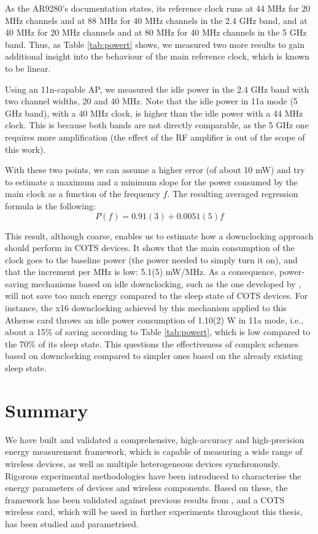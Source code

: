 \documentclass[twoside,nohyper]{tufte-book}
\theoremstyle{definition}
\theoremstyle{definition}
\theoremstyle{definition}
\theoremstyle{remark}
\begin{document}
As the AR9280's documentation states, its reference clock runs at 44 MHz
for 20 MHz channels and at 88 MHz for 40 MHz channels in the 2.4 GHz
band, and at 40 MHz for 20 MHz channels and at 80 MHz for 40 MHz
channels in the 5 GHz band. Thus, as Table \ref{tab:powert} shows, we
measured two more results to gain additional insight into the behaviour
of the main reference clock, which is known to be
linear\cite[0pt]{Zhang2012}.

Using an 11n-capable AP, we measured the idle power in the 2.4 GHz band
with two channel widths, 20 and 40 MHz. Note that the idle power in 11a
mode (5 GHz band), with a 40 MHz clock, is higher than the idle power
with a 44 MHz clock. This is because both bands are not directly
comparable, as the 5 GHz one requires more amplification (the effect of
the RF amplifier is out of the scope of this work).

With these two points, we can assume a higher error (of about 10 mW) and
try to estimate a maximum and a minimum slope for the power consumed by
the main clock as a function of the frequency \(f\). The resulting
averaged regression formula is the following:
%
\begin{equation}
 P(f) = 0.91(3) + 0.0051(5)f \label{eq:Pf}
\end{equation}
%

This result, although coarse, enables us to estimate how a downclocking
approach should perform in COTS devices. It shows that the main
consumption of the clock goes to the baseline power (the power needed to
simply turn it on), and that the increment per MHz is low: 5.1(5)
mW/MHz. As a consequence, power-saving mechanisms based on idle
downclocking, such as the one developed by \citet{Zhang2012}, will not
save too much energy compared to the sleep state of COTS devices. For
instance, the x16 downclocking achieved by this mechanism applied to
this Atheros card throws an idle power consumption of 1.10(2) W in 11a
mode, i.e., about a 15\% of saving according to Table \ref{tab:powert},
which is low compared to the 70\% of its sleep state. This questions the
effectiveness of complex schemes based on downclocking compared to
simpler ones based on the already existing sleep state.

\section{Summary}\label{summary}

We have built and validated a comprehensive, high-accuracy and
high-precision energy measurement framework, which is capable of
measuring a wide range of wireless devices, as well as multiple
heterogeneous devices synchronously. Rigorous experimental methodologies
have been introduced to characterise the energy parameters of devices
and wireless components. Based on these, the framework has been
validated against previous results from \citet{Serrano2014}, and a COTS
wireless card, which will be used in further experiments throughout this
thesis, has been studied and parametrised.
\end{document}
